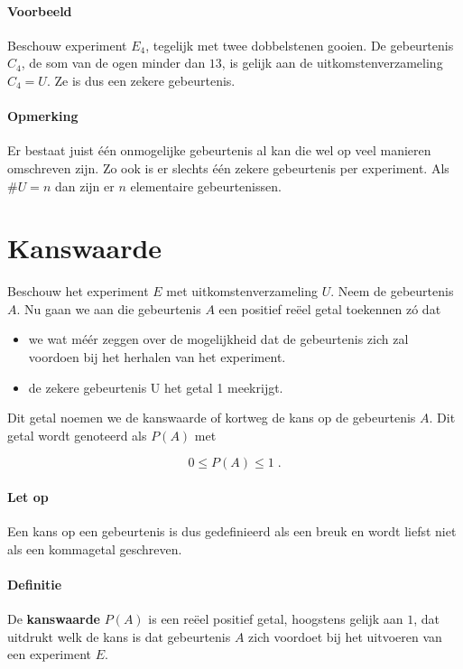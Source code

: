 \documentclass[12pt,twoside]{article}
\begin{document}
\paragraph*{Voorbeeld} Beschouw experiment $E_4$, tegelijk met twee dobbelstenen gooien. De gebeurtenis $C_4$, de som van de ogen minder dan $13$, is gelijk aan de uitkomstenverzameling $C_4=U$. Ze is dus een zekere gebeurtenis.

\paragraph*{Opmerking}
Er bestaat juist één onmogelijke gebeurtenis al kan die wel op veel manieren omschreven zijn. Zo ook is er slechts één zekere gebeurtenis per experiment. Als $\#U = n$ dan zijn er $n$ elementaire gebeurtenissen.

\pagebreak
\section{Kanswaarde}

Beschouw het experiment $E$ met uitkomstenverzameling $U$. Neem de gebeurtenis $A$.
Nu gaan we aan die gebeurtenis $A$ een positief reëel getal toekennen zó dat
\begin{itemize}
  \item we wat méér zeggen over de mogelijkheid dat de gebeurtenis zich zal voordoen bij het herhalen van het experiment.
  \item de zekere gebeurtenis U het getal 1 meekrijgt.
\end{itemize}

Dit getal noemen we de kanswaarde of kortweg de kans op de gebeurtenis $A$. Dit getal wordt genoteerd als $P(A)$ met\\
\begin{mdframed}
$$0 \leq P(A) \leq 1\;.$$
\end{mdframed}

\paragraph*{Let op} Een kans op een gebeurtenis is dus gedefinieerd als een breuk en wordt liefst niet als
een kommagetal geschreven.

\paragraph*{Definitie} De {\bf kanswaarde} $P(A)$ is een reëel positief getal, hoogstens gelijk aan $1$, dat uitdrukt welk de kans is dat gebeurtenis $A$ zich voordoet bij het uitvoeren van een experiment $E$.
\end{document}
